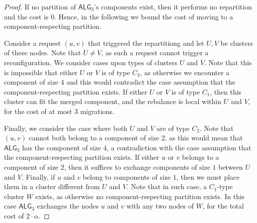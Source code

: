 \documentclass[manuscript,screen=true]{acmart}
\newcommand{\TAlg}{{\ensuremath{\textsf{ALG}_{3}}}\xspace} %
\begin{document}
\begin{proof}
  If no partition of \TAlg's components exist, then it performs no repartition and the cost is $0$.
  Hence, in the following we bound the cost of moving to a component-respecting partition.

  
    Consider a request $(u, v)$ that triggered the repartitiong and let $U, V$ be clusters of these nodes.
    Note that $U\neq V$, as such a request cannot trigger a reconfiguration.
    We consider cases upon types of clusters $U$ and $V$.
    Note that this is impossible that either $U$ or $V$ is of type $C_3$, as otherwise we encounter a component of size $4$ and this would contradict the case assumption that the component-respecting partition exists.
    If either $U$ or $V$ is of type $C_1$, then this cluster can fit the merged component, and the rebalance is local within $U$ and $V$, for the cost of at most $3$ migrations.
  
    Finally, we consider the case where both $U$ and $V$ are of type $C_2$. Note that $(u,v)$ cannot both belong to a component of size $2$, as this would mean that \TAlg has the component of size $4$, a contradiction with the case assumption that the component-respecting partition exists. 
    If either $u$ or $v$ belongs to a component of size $2$, then it suffices to exchange components of size $1$ between $U$ and $V$.
    Finally, if $u$ and $v$ belong to components of size $1$, then we must place them in a cluster different from $U$ and $V$.
    Note that in such case, a $C_1$-type cluster $W$ exists, as otherwise no component-respecting partition exists. In this case \TAlg exchanges the nodes $u$ and $v$ with any two nodes of $W$, for the total cost of $2\cdot \alpha$.
\end{proof}
\end{document}
